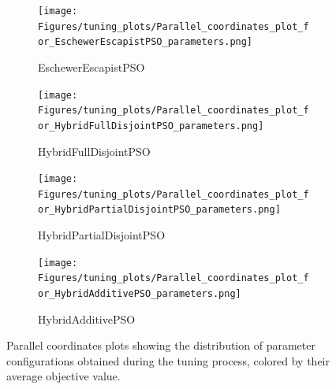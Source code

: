 \begin{figure}[H]\ContinuedFloat
    \centering
    \begin{subfigure}{0.49\textwidth}
        \centering
        \texttt{[image: Figures/tuning\_plots/Parallel\_coordinates\_plot\_for\_EschewerEscapistPSO\_parameters.png]}
        \caption{EschewerEscapistPSO}
    \end{subfigure}
    \begin{subfigure}{0.49\textwidth}
        \centering
        \texttt{[image: Figures/tuning\_plots/Parallel\_coordinates\_plot\_for\_HybridFullDisjointPSO\_parameters.png]}
        \caption{HybridFullDisjointPSO}
    \end{subfigure}
    \begin{subfigure}{0.49\textwidth}
        \centering
        \texttt{[image: Figures/tuning\_plots/Parallel\_coordinates\_plot\_for\_HybridPartialDisjointPSO\_parameters.png]}
        \caption{HybridPartialDisjointPSO}
    \end{subfigure}
    \begin{subfigure}{0.49\textwidth}
        \centering
        \texttt{[image: Figures/tuning\_plots/Parallel\_coordinates\_plot\_for\_HybridAdditivePSO\_parameters.png]}
        \caption{HybridAdditivePSO}
    \end{subfigure}
\caption[Parallel coordinates plots of parameter configurations]{Parallel coordinates plots showing the distribution of parameter configurations obtained during the tuning process, colored by their average objective value.}
\label{fig:parameter_plots}
\end{figure}